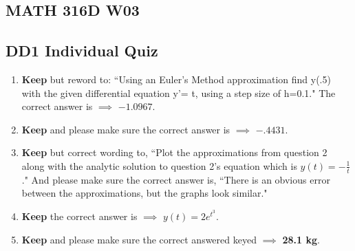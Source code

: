 \documentclass[11pt]{article}
\begin{document}
	
\begin{center}\section*{MATH 316D W03}\end{center}
\subsection*{DD1 Individual Quiz}

\begin{enumerate}
	\item \textbf{Keep} but reword to: \textquotedblleft Using an Euler's Method approximation find y(.5) with the given differential equation y'= t, using a step size of h=0.1." The correct answer is $\implies$ $-1.0967$.
	\item \textbf{Keep} and please make sure the correct answer is $\implies$ $-.4431$.
	\item \textbf{Keep} but correct wording to, \textquotedblleft Plot the approximations from question 2 along with the analytic solution
to question 2's equation which is $y(t)=-\frac{1}{t}$." And please make sure the correct answer is, \textquotedblleft There is an obvious error between the approximations, but the graphs look similar."
	\item \textbf{Keep} the correct answer is $\implies$ $y(t)=2e^{t^{3}}$.
	\item \textbf{Keep} and please make sure the correct answered keyed $\implies$ \textbf{28.1 kg}. 
\end{enumerate}
\end{document}
